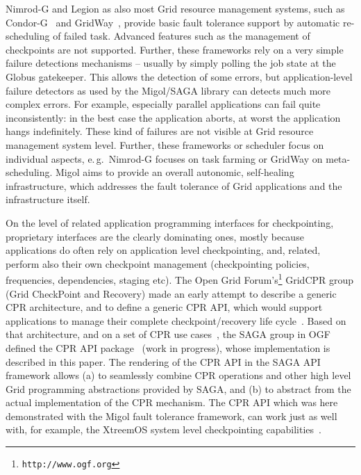 \documentclass[times, 10pt,twocolumn]{article}
\begin{document}
Nimrod-G and Legion as also most Grid resource management systems, such as Condor-G~\cite{citeulike:291860} and GridWay~\cite{Montero05}, provide basic fault tolerance support by automatic re-scheduling of failed task. Advanced features such as the management of checkpoints are not supported. Further, these frameworks rely on a very simple failure detections mechanisms -- usually by simply polling the job state at the Globus gatekeeper. This allows the detection of some errors, but application-level failure detectors as used by the Migol/SAGA library can detects much more complex errors. For example, especially parallel applications can fail quite inconsistently: in the best case the application aborts, at worst the application hangs indefinitely. These kind of failures are not visible at Grid resource management system level. Further, these frameworks or scheduler focus on individual aspects, e.\,g.\ Nimrod-G focuses on task farming or GridWay on meta-scheduling. Migol aims to provide an overall autonomic, self-healing infrastructure, which addresses the fault tolerance of Grid applications and the infrastructure itself. 


On the level of related application programming interfaces for
checkpointing, proprietary interfaces are the clearly dominating
ones, mostly because applications do often rely on application level
checkpointing, and, related, perform also their own checkpoint
management (checkpointing policies, frequencies, dependencies, staging
etc).  The Open Grid Forum's\footnote{\texttt{http://www.ogf.org}}
GridCPR group (Grid CheckPoint and Recovery) made an early attempt to
describe a generic CPR architecture, and to define a generic CPR API,
which would support applications to manage their complete
checkpoint/recovery life cycle~\cite{ogf_cpr_arch}.  Based on that
architecture, and on a set of CPR use cases~\cite{ogf_cpr_uc}, the
SAGA group in OGF defined the CPR API package~\cite{ogf_cpr_draft}
(work in progress), whose implementation is described in this paper.
The rendering of the CPR API in the SAGA API framework allows (a) to
seamlessly combine CPR operations and other high level Grid
programming abstractions provided by SAGA, and (b) to abstract from
the actual implementation of the CPR mechanism.  The CPR API which was
here demonstrated with the Migol fault tolerance framework, can work
just as well with, for example, the XtreemOS system level
checkpointing capabilities~\cite{xtreemos_cpr}.

% 
\end{document}
